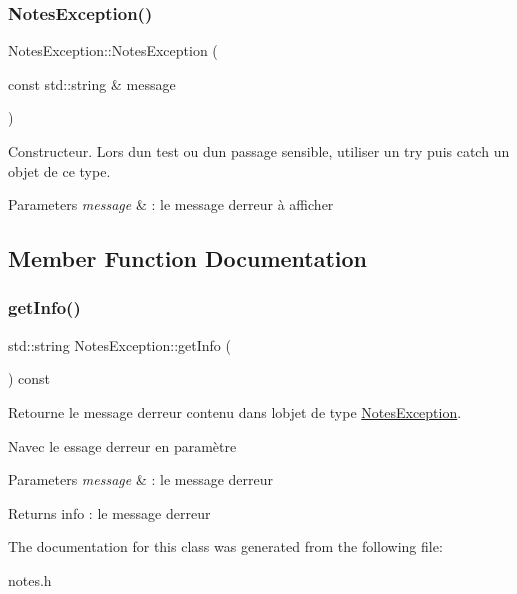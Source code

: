 \subsubsection{\texorpdfstring{Notes\+Exception()}{NotesException()}}
{\footnotesize\ttfamily Notes\+Exception\+::\+Notes\+Exception (\begin{DoxyParamCaption}\item[{const std\+::string \&}]{message }\end{DoxyParamCaption})\hspace{0.3cm}{\ttfamily [inline]}}



Constructeur. Lors d\textquotesingle{}un test ou d\textquotesingle{}un passage sensible, utiliser un try puis catch un objet de ce type. 


\begin{DoxyParams}{Parameters}
{\em message} & \+: le message d\textquotesingle{}erreur à afficher \\
\hline
\end{DoxyParams}


\subsection{Member Function Documentation}
\mbox{\label{class_notes_exception_a5108cf9d122f28f9cb51c0c31c4f2a35}} 
\subsubsection{\texorpdfstring{get\+Info()}{getInfo()}}
{\footnotesize\ttfamily std\+::string Notes\+Exception\+::get\+Info (\begin{DoxyParamCaption}{ }\end{DoxyParamCaption}) const\hspace{0.3cm}{\ttfamily [inline]}}



Retourne le message d\textquotesingle{}erreur contenu dans l\textquotesingle{}objet de type \hyperlink{class_notes_exception}{Notes\+Exception}. 

Navec le essage d\textquotesingle{}erreur en paramètre 
\begin{DoxyParams}{Parameters}
{\em message} & \+: le message d\textquotesingle{}erreur \\
\hline
\end{DoxyParams}
\begin{DoxyReturn}{Returns}
info \+: le message d\textquotesingle{}erreur 
\end{DoxyReturn}


The documentation for this class was generated from the following file\+:\begin{DoxyCompactItemize}
\item 
notes.\+h\end{DoxyCompactItemize}
